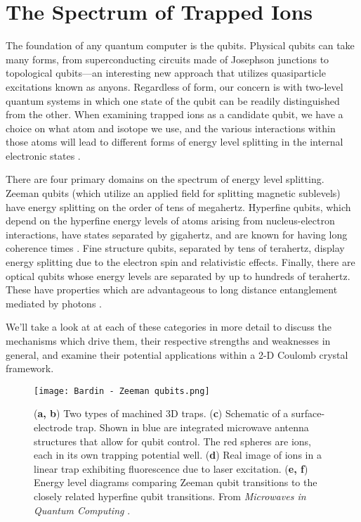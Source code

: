 \section{The Spectrum of Trapped Ions}
The foundation of any quantum computer is the qubits. Physical qubits can take many forms, from superconducting circuits made of Josephson junctions to topological qubits---an interesting new approach that utilizes quasiparticle excitations known as anyons. Regardless of form, our concern is with two-level quantum systems in which one state of the qubit can be readily distinguished from the other. When examining trapped ions as a candidate qubit, we have a choice on what atom and isotope we use, and the various interactions within those atoms will lead to different forms of energy level splitting in the internal electronic states \cite{Bruzewicz}. 

There are four primary domains on the spectrum of energy level splitting. Zeeman qubits (which utilize an applied field for splitting magnetic sublevels) have energy splitting on the order of tens of megahertz. Hyperfine qubits, which depend on the hyperfine energy levels of atoms arising from nucleus-electron interactions, have states separated by gigahertz, and are known for having long coherence times \cite{Warring}. Fine structure qubits, separated by tens of terahertz, display energy splitting due to the electron spin and relativistic effects. Finally, there are optical qubits whose energy levels are separated by up to hundreds of terahertz. These have properties which are advantageous to long distance entanglement mediated by photons \cite{Dietrich}.

We'll take a look at at each of these categories in more detail to discuss the mechanisms which drive them, their respective strengths and weaknesses in general, and examine their potential applications within a 2-D Coulomb crystal framework.

\begin{figure}[ht]
    \texttt{[image: Bardin - Zeeman qubits.png]}
    \caption{(\textbf{a, b}) Two types of machined 3D traps. (\textbf{c}) Schematic of a surface-electrode trap. Shown in blue are integrated microwave antenna structures that allow for qubit control. The red spheres are ions, each in its own trapping potential well. (\textbf{d}) Real image of ions in a linear trap exhibiting fluorescence due to laser excitation. (\textbf{e, f}) Energy level diagrams comparing Zeeman qubit transitions to the closely related hyperfine qubit transitions. From \textit{Microwaves in Quantum Computing} \cite{Bardin}.}
    \label{fig:Zeeman qubit}
\end{figure}

